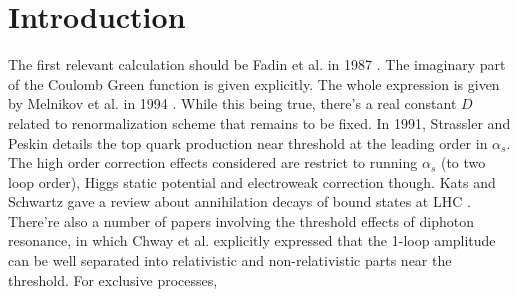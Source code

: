 \documentclass[english,aps,prd,preprint,showpacs,superscriptaddress,groupedaddress,fixfloats]{revtex4-1}
\begin{document}
\section{Introduction}
The first relevant calculation should be Fadin et al. in 1987 \cite{Fadin1987}. The imaginary part of the Coulomb Green function is given explicitly. The whole expression is given by Melnikov et al. in 1994 \cite{Melnikov:1994jb}. While this being true, there's a real constant $D$ related to renormalization scheme that remains to be fixed. In 1991, Strassler and Peskin details the top quark production near threshold at the leading order in $\alpha_s$. The high order correction effects considered are restrict to running $\alpha_s$ (to two loop order), Higgs static potential and electroweak correction though. Kats and Schwartz gave a review about annihilation decays of bound states at LHC \cite{Kats:2009bv}. There're also a number of papers involving the threshold effects of diphoton resonance\cite{}, in which Chway et al. explicitly expressed that the 1-loop amplitude can be well separated into relativistic and non-relativistic parts near the threshold. 
For exclusive processes, 
\end{document}
